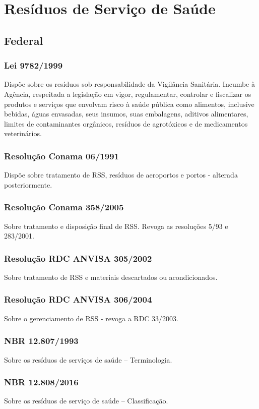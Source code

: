 \section{Resíduos de Serviço de Saúde}
\begin{subapend}
\subsection{Federal}	
	\begin{subsubapend}
		
		\subsubsection{Lei 9782/1999}
		Dispõe sobre os resíduos sob responsabilidade da Vigilância Sanitária. Incumbe à Agência, respeitada a legislação em vigor, regulamentar, controlar e fiscalizar os produtos e serviços que envolvam risco à saúde pública como alimentos, inclusive bebidas, águas envasadas, seus insumos, suas embalagens, aditivos alimentares, limites de contaminantes orgânicos, resíduos de agrotóxicos e de medicamentos veterinários.
		\subsubsection{Resolução Conama 06/1991}
		Dispõe sobre tratamento de RSS, resíduos de aeroportos e portos - alterada posteriormente.
		\subsubsection{Resolução Conama 358/2005}
		Sobre tratamento e disposição final de RSS. Revoga as resoluções 5/93 e 283/2001.
		\subsubsection{Resolução RDC ANVISA 305/2002}
		Sobre tratamento de RSS e materiais descartados ou acondicionados.
		\subsubsection{Resolução RDC ANVISA 306/2004}
		Sobre o gerenciamento de RSS - revoga a RDC 33/2003.
		\subsubsection{NBR 12.807/1993}
		Sobre os resíduos de serviços de saúde – Terminologia.
		\subsubsection{NBR 12.808/2016}
		Sobre os resíduos de serviço de saúde – Classificação.

\end{subsubapend}
\end{subapend}
